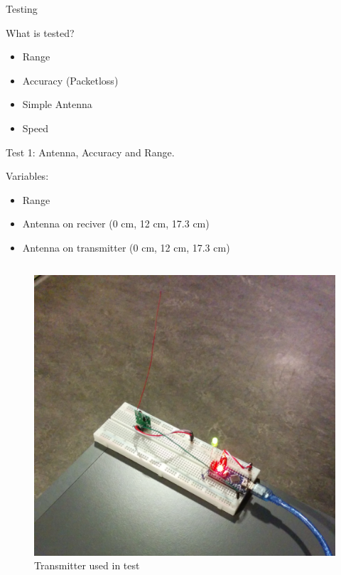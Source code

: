 \begin{frame}{Testing}
    \begin{block}{What is tested?}
        \begin{itemize}
            \item Range
            \item Accuracy (Packetloss)
            \item Simple Antenna
            \item Speed
        \end{itemize}       
    \end{block} 
\end{frame}

\begin{frame}{Test 1: Antenna, Accuracy and Range.}
    \begin{block}{Variables:}
        \begin{itemize}
            \item Range
            \item Antenna on reciver (0 cm, 12 cm, 17.3 cm)
            \item Antenna on transmitter (0 cm, 12 cm, 17.3 cm)
        \end{itemize}
    \end{block}
    

    \begin{minipage}[0.3\textheight]{\textwidth}
        \begin{columns}[T]
            \begin{column}{0.3\textwidth}
                \begin{figure}
                    \includegraphics[height=0.45\textheight,keepaspectratio]{figures/Test_Pic.jpg}
                    \caption*{Transmitter used in test}
                \end{figure}
            \end{column}


\end{columns}
\end{minipage}
\end{frame}

